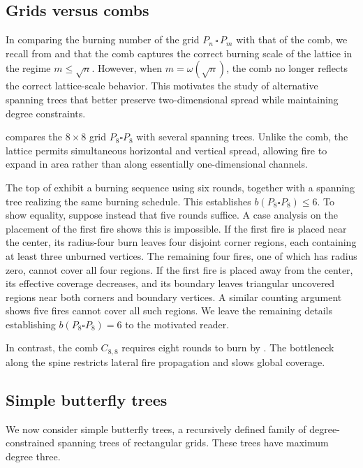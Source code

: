 \documentclass{article}
\begin{document}
\subsection{Grids versus combs}

In comparing the burning number of the grid $P_n \,\square\, P_m$ with that of the comb, we recall from  and  that the comb captures the correct burning scale of the lattice in the regime $m \le \sqrt{n}$. However, when $m = \omega(\sqrt{n})$, the comb no longer reflects the correct lattice-scale behavior. This motivates the study of alternative spanning trees that better preserve two-dimensional spread while maintaining degree constraints.

 compares the $8 \times 8$ grid $P_8 \square P_8$ with several spanning trees. Unlike the comb, the lattice permits simultaneous horizontal and vertical spread, allowing fire to expand in area rather than along essentially one-dimensional channels.

The top  of  exhibit a burning sequence using six rounds, together with a spanning tree realizing the same burning schedule. This establishes $b(P_8 \square P_8) \le 6$. To show equality, suppose instead that five rounds suffice. A case analysis on the placement of the first fire shows this is impossible. If the first fire is placed near the center, its radius-four burn leaves four disjoint corner regions, each containing at least three unburned vertices. The remaining four fires, one of which has radius zero, cannot cover all four regions. If the first fire is placed away from the center, its effective coverage decreases, and its boundary leaves triangular uncovered regions near both corners and boundary vertices. A similar counting argument shows five fires cannot cover all such regions. We leave the remaining details establishing $b(P_8 \square P_8) = 6$ to the motivated reader.

In contrast, the comb $C_{8,8}$ requires eight rounds to burn by . The bottleneck along the spine restricts lateral fire propagation and slows global coverage.

\subsection{Simple butterfly trees}

We now consider simple butterfly trees, a recursively defined family of degree-constrained spanning trees of rectangular grids. These trees have maximum degree three. 
\end{document}
